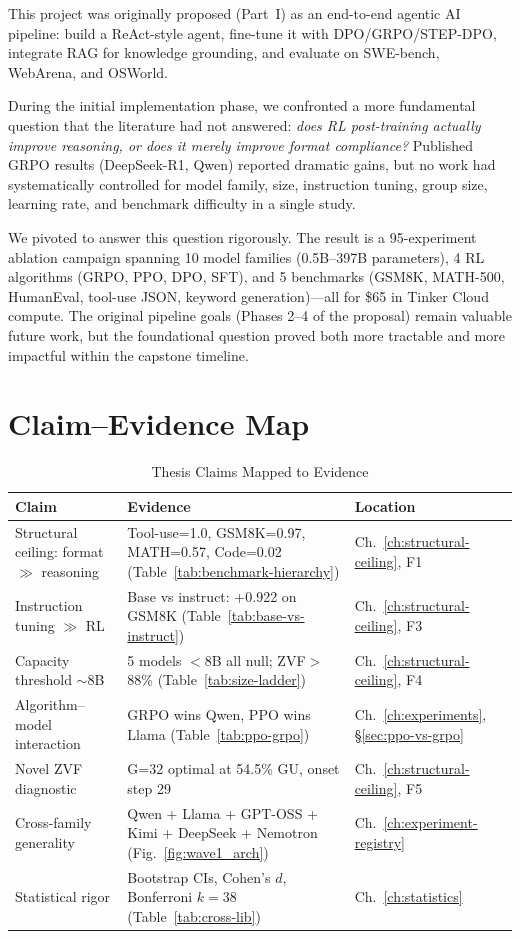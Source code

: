 \documentclass[12pt,a4paper]{report}
\theoremstyle{definition}
\begin{document}
This project was originally proposed (Part~I) as an end-to-end agentic AI pipeline: build a ReAct-style agent, fine-tune it with DPO/GRPO/STEP-DPO, integrate RAG for knowledge grounding, and evaluate on SWE-bench, WebArena, and OSWorld.

During the initial implementation phase, we confronted a more fundamental question that the literature had not answered: \emph{does RL post-training actually improve reasoning, or does it merely improve format compliance?} Published GRPO results (DeepSeek-R1, Qwen) reported dramatic gains, but no work had systematically controlled for model family, size, instruction tuning, group size, learning rate, and benchmark difficulty in a single study.

We pivoted to answer this question rigorously. The result is a 95-experiment ablation campaign spanning 10 model families (0.5B--397B parameters), 4 RL algorithms (GRPO, PPO, DPO, SFT), and 5 benchmarks (GSM8K, MATH-500, HumanEval, tool-use JSON, keyword generation)---all for \$65 in Tinker Cloud compute. The original pipeline goals (Phases 2--4 of the proposal) remain valuable future work, but the foundational question proved both more tractable and more impactful within the capstone timeline.

\section*{Claim--Evidence Map}

\begin{table}[htbp]
\centering
\caption{Thesis Claims Mapped to Evidence}
\label{tab:thesis-map}
\small
\begin{tabular}{p{5.5cm}p{4.5cm}p{3cm}}
\toprule
\textbf{Claim} & \textbf{Evidence} & \textbf{Location} \\
\midrule
Structural ceiling: format $\gg$ reasoning & Tool-use=1.0, GSM8K=0.97, MATH=0.57, Code=0.02 (Table~\ref{tab:benchmark-hierarchy}) & Ch.~\ref{ch:structural-ceiling}, F1 \\
Instruction tuning $\gg$ RL & Base vs instruct: +0.922 on GSM8K (Table~\ref{tab:base-vs-instruct}) & Ch.~\ref{ch:structural-ceiling}, F3 \\
Capacity threshold $\sim$8B & 5 models $<$8B all null; ZVF$>$88\% (Table~\ref{tab:size-ladder}) & Ch.~\ref{ch:structural-ceiling}, F4 \\
Algorithm--model interaction & GRPO wins Qwen, PPO wins Llama (Table~\ref{tab:ppo-grpo}) & Ch.~\ref{ch:experiments}, \S\ref{sec:ppo-vs-grpo} \\
Novel ZVF diagnostic & G=32 optimal at 54.5\% GU, onset step 29 & Ch.~\ref{ch:structural-ceiling}, F5 \\
Cross-family generality & Qwen + Llama + GPT-OSS + Kimi + DeepSeek + Nemotron (Fig.~\ref{fig:wave1_arch}) & Ch.~\ref{ch:experiment-registry} \\
Statistical rigor & Bootstrap CIs, Cohen's $d$, Bonferroni $k\!=\!38$ (Table~\ref{tab:cross-lib}) & Ch.~\ref{ch:statistics} \\
\bottomrule
\end{tabular}
\end{table}
\end{document}
